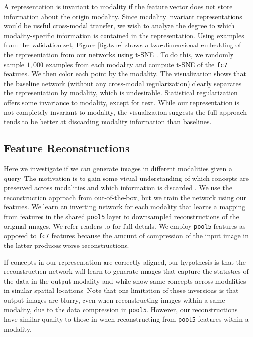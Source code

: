 \documentclass[10pt,journal,compsoc]{IEEEtran}
\begin{document}
    A representation is invariant to modality if the feature vector does not store information about the origin modality. Since modality invariant representations would be useful cross-modal transfer, we wish to analyze the degree to which modality-specific information is contained in the representation. Using examples from the validation set, Figure \ref{fig:tsne} shows a two-dimensional embedding of the representation from our networks using t-SNE \cite{maaten2008visualizing}. To do this, we randomly sample $1,000$ examples from each modality and compute t-SNE of the \texttt{fc7} features. We then color each point by the modality. The visualization shows that the baseline network (without any cross-modal regularization) clearly separates the representation by modality, which is undesirable. Statistical regularization offers some invariance to modality, except for text. While our representation is not completely invariant to modality, the visualization suggests the full approach tends to be better at discarding modality information than baselines.
    
	\subsection{Feature Reconstructions}
	Here we investigate if we can generate images in different modalities given a query. The motivation is to gain some visual understanding of which concepts are preserved across modalities and which information is discarded \cite{vondrick2013hoggles}. We use the reconstruction approach from \cite{dosovitskiy2015inverting} out-of-the-box, but we train the network using our features. We learn an inverting network for each modality that learns a mapping from features in the shared \texttt{pool5} layer to downsampled reconstructions of the original images. We refer readers to \cite{dosovitskiy2015inverting} for full details. We employ \texttt{pool5} features as opposed to \texttt{fc7} features because the amount of compression of the input image in the latter produces worse reconstructions.
		
		

	

    If concepts in our representation are correctly aligned, our hypothesis is that the reconstruction network will learn to generate images that capture the statistics of the data in the output modality and while show same concepts across modalities in similar spatial locations. Note that one limitation of these inversions is that output images are blurry, even when reconstructing images within a same modality, due to the data compression in \texttt{pool5}. However, our reconstructions have similar quality to those in \cite{dosovitskiy2015inverting} when reconstructing from \texttt{pool5} features within a modality.
	
\end{document}
